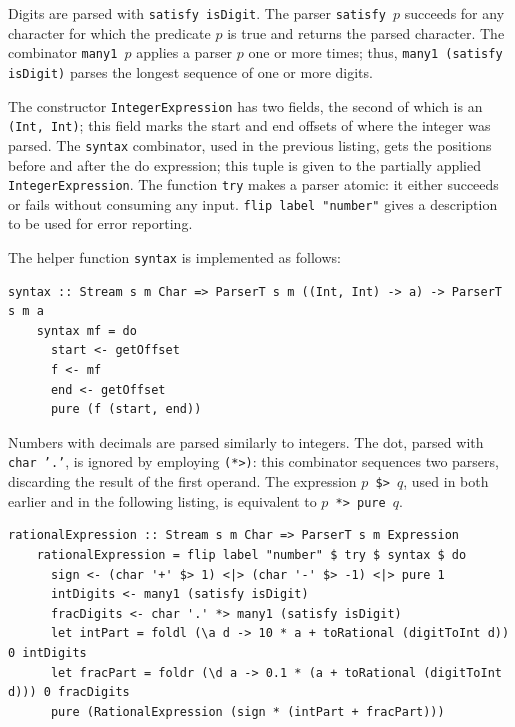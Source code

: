 \documentclass[UdineBachThesis,american,11pt]{PhdThesis}
\begin{document}
  Digits are parsed with \mbox{\texttt{satisfy isDigit}}. The parser
  \mbox{\texttt{satisfy $p$}} succeeds for any character for which the predicate
  $p$ is true and returns the parsed character. The combinator
  \mbox{\texttt{many1 $p$}} applies a parser $p$ one or more times; thus,
  \mbox{\texttt{many1 (satisfy isDigit)}} parses the longest sequence of one or
  more digits.

  The constructor \mbox{\texttt{IntegerExpression}} has two fields, the second
  of which is an \mbox{\texttt{(Int, Int)}}; this field marks the start and end
  offsets of where the integer was parsed. The \mbox{\texttt{syntax}}
  combinator, used in the previous listing, gets the positions before and after
  the do expression; this tuple is given to the partially applied
  \mbox{\texttt{IntegerExpression}}. The function \mbox{\texttt{try}} makes a
  parser atomic: it either succeeds or fails without consuming any input.
  \mbox{\texttt{flip label "number"}} gives a description to be used for error
  reporting.

  The helper function \mbox{\texttt{syntax}} is implemented as follows:

  \begin{Verbatim}[gobble=4,fontsize=\small]
    syntax :: Stream s m Char => ParserT s m ((Int, Int) -> a) -> ParserT s m a
    syntax mf = do
      start <- getOffset
      f <- mf
      end <- getOffset
      pure (f (start, end))
  \end{Verbatim}

  Numbers with decimals are parsed similarly to integers. The dot, parsed with
  \mbox{\texttt{char '.'}}, is ignored by employing \mbox{\texttt{(*>)}}: this
  combinator sequences two parsers, discarding the result of the first operand.
  The expression \texttt{$p$ \$> $q$}, used in both earlier and in the following
  listing, is equivalent to \mbox{\texttt{$p$ *> pure $q$}}.

  \begin{Verbatim}[gobble=4,fontsize=\small]
    rationalExpression :: Stream s m Char => ParserT s m Expression
    rationalExpression = flip label "number" $ try $ syntax $ do
      sign <- (char '+' $> 1) <|> (char '-' $> -1) <|> pure 1
      intDigits <- many1 (satisfy isDigit)
      fracDigits <- char '.' *> many1 (satisfy isDigit)
      let intPart = foldl (\a d -> 10 * a + toRational (digitToInt d)) 0 intDigits
      let fracPart = foldr (\d a -> 0.1 * (a + toRational (digitToInt d))) 0 fracDigits
      pure (RationalExpression (sign * (intPart + fracPart)))
  \end{Verbatim}
\end{document}

